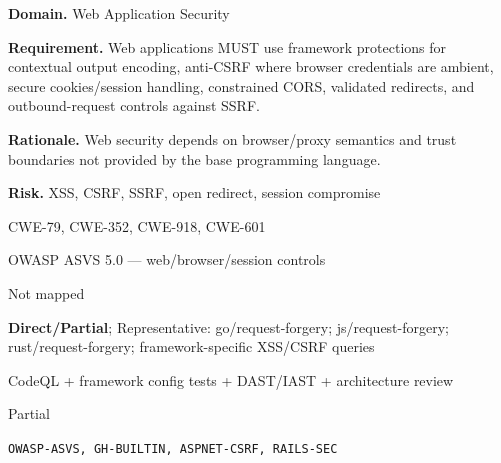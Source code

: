 \documentclass[10pt,letterpaper]{article}
\newcommand{\prioritybadge}[2]{\tcbox[on line,boxrule=0pt,arc=1.2mm,boxsep=0.7mm,left=1mm,right=1mm,top=0.4mm,bottom=0.4mm,colback=#2!12,coltext=#2]{\scriptsize\bfseries #1}}
\begin{document}
\begin{rulebox}[title={\texttt{SCS-ALL-WEB-001} \hfill \prioritybadge{Critical Control}{Critical}}]
\textbf{Domain.} Web Application Security

\textbf{Requirement.} Web applications MUST use framework protections for contextual output encoding, anti-CSRF where browser credentials are ambient, secure cookies/session handling, constrained CORS, validated redirects, and outbound-request controls against SSRF.

\textbf{Rationale.} Web security depends on browser/proxy semantics and trust boundaries not provided by the base programming language.

\textbf{Risk.} XSS, CSRF, SSRF, open redirect, session compromise

\begin{description}[leftmargin=2.65cm,labelwidth=2.3cm,style=nextline,itemsep=1pt,topsep=3pt]
  \item[CWE] CWE-79, CWE-352, CWE-918, CWE-601
  \item[OWASP] OWASP ASVS 5.0 --- web/browser/session controls
  \item[CERT] Not mapped
  \item[CodeQL] \textbf{Direct/Partial}; Representative: go/request-forgery; js/request-forgery; rust/request-forgery; framework-specific XSS/CSRF queries
  \item[Enforcement] CodeQL + framework config tests + DAST/IAST + architecture review
  \item[Automation] Partial
  \item[Sources] \texttt{OWASP-ASVS, GH-BUILTIN, ASPNET-CSRF, RAILS-SEC}
\end{description}
\end{rulebox}
\end{document}
